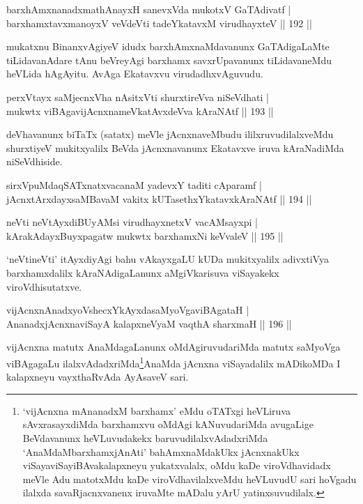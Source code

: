 \begin{shl}
barxhAmxnanadxmathAnayxH sanevxVda mukotxV GaTAdivatf |\\
barxhamxtavxmanoyxV veVdeVti tadeYkatavxM virudhayxteV \hfill || 192 ||
\end{shl}

\begin{artha}%
mukatxnu BinanxvAgiyeV idudx barxhAmxnaMdavanunx GaTAdigaLaMte tiLidavanAdare tAnu beVreyAgi barxhamx savxrUpavanunx tiLidavaneMdu heVLida hAgAyitu. AvAga Ekatavxvu virudadhxvAguvudu.
\end{artha}

\begin{shl}
perxVtayx saMjecnxVha nAsitxVti shurxtireVva niSeVdhati |\\
mukwtx viBAgavijAcnxnameVkatAvxdeVva kAraNAtf \hfill || 193 ||
\end{shl}

\begin{artha}
deVhavanunx biTaTx (satatx) meVle jAcnxnaveMbudu  ililxruvudilalxveMdu shurxtiyeV mukitxyalilx BeVda jAcnxnavanunx Ekatavxve iruva kAraNadiMda niSeVdhiside.
\end{artha}

\begin{shl}
sirxVpuMdaqSATxnatxvacanaM yadevxY taditi cAparamf |\\
jAcnxtArxdayxsaMBavaM vakitx kUTasethxYkatavxkAraNAtf \hfill || 194 ||
\end{shl}

\begin{shl}
neVti neVtAyxdiBUyAMsi virudhayxnetxV vacAMsayxpi |\\
kArakAdayxBuyxpagatw mukwtx barxhamxNi keVvaleV \hfill || 195 ||
\end{shl}

\begin{artha}
`neVtineVti' itAyxdiyAgi bahu vAkayxgaLU kUDa mukitxyalilx adivxtiVya barxhamxdalilx kAraNAdigaLanunx aMgiVkarisuva viSayakekx viroVdhisutatxve.
\end{artha}

\begin{shl}
vijAcnxnAnadxyoVshecxYkAyxdasaMyoVgaviBAgataH |\\
AnanadxjAcnxnaviSayA kalapxneVyaM vaqthA sharxmaH \hfill || 196 ||
\end{shl}	

\begin{artha}
vijAcnxna matutx AnaMdagaLanunx oMdAgiruvudariMda matutx saMyoVga viBAgagaLu ilalxvAdadxriMda\footnote[1]{`vijAcnxna mAnanadxM barxhamx' eMdu oTATxgi heVLiruva sAvxrasayxdiMda barxhamxvu oMdAgi kANuvudariMda avugaLige BeVdavanunx heVLuvudakekx baruvudilalxvAdadxriMda `AnaMdaMbarxhamxjAnAti' bahAmxnaMdakUkx jAcnxnakUkx viSayaviSayiBAvakalapxneyu yukatxvalalx, oMdu kaDe viroVdhavidadx meVle Adu matotxMdu kaDe viroVdhavilalxveMdu heVLuvudU sari hoVgadu ilalxda savaRjacnxvanenx iruvaMte mADalu yArU yatinxsuvudilalx.}AnaMda jAcnxna viSayadalilx mADikoMDa I kalapxneyu vayxthaRvAda AyAsaveV sari.
\end{artha}


